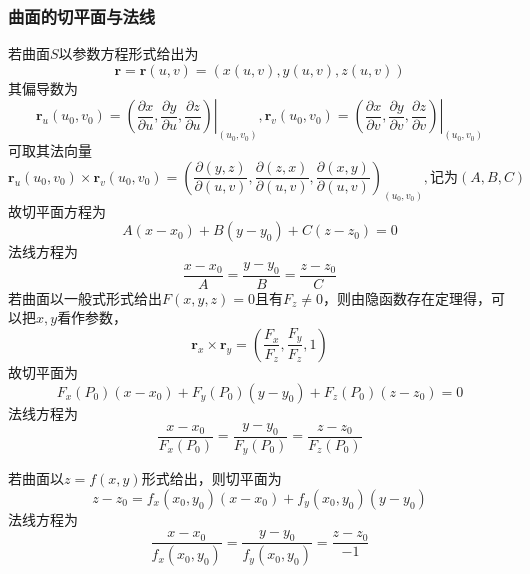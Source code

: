 \subsubsection{曲面的切平面与法线}
若曲面$ S $以参数方程形式给出为
\begin{equation}\label{key}
	\bm{r}=\bm{r}(u,v)=(x(u,v),y(u,v),z(u,v))
\end{equation}
其偏导数为
\begin{equation}\label{key}
	\bm{r}_u(u_0,v_0)=\left .(\dfrac{\partial x}{\partial u},\dfrac{\partial y}{\partial u},\dfrac{\partial z}{\partial u})\right |_{(u_0,v_0)},	\bm{r}_v(u_0,v_0)=\left .(\dfrac{\partial x}{\partial v},\dfrac{\partial y}{\partial v},\dfrac{\partial z}{\partial v})\right |_{(u_0,v_0)}
\end{equation}
可取其法向量
\begin{equation}\label{key}
	\bm{r}_u(u_0,v_0) \times \bm{r}_v(u_0,v_0)=(\dfrac{\partial (y,z)}{\partial (u,v)},\dfrac{\partial (z,x)}{\partial (u,v)},\dfrac{\partial (x,y)}{\partial (u,v)})_{(u_0,v_0)},\text{记为}(A,B,C)
\end{equation}
故切平面方程为
\begin{equation}\label{key}
	A(x-x_0)+B(y-y_0)+C(z-z_0)=0
\end{equation}
法线方程为
\begin{equation}\label{key}
	\dfrac{x-x_0}{A}=\dfrac{y-y_0}{B}=\dfrac{z-z_0}{C}
\end{equation}
若曲面以一般式形式给出$ F(x,y,z)=0 $且有$ F_z \neq 0 $，则由隐函数存在定理得，可以把$ x,y $看作参数，
\begin{equation}\label{key}
	\bm{r}_x\times \bm{r}_y=(\dfrac{F_x}{F_z},\dfrac{F_y}{F_z},1)
\end{equation}
故切平面为
\begin{equation}\label{key}
	F_x(P_0)(x-x_0)+F_y(P_0)(y-y_0)+F_z(P_0)(z-z_0)=0
\end{equation}
法线方程为
\begin{equation}\label{key}
	\dfrac{x-x_0}{F_x(P_0)}=\dfrac{y-y_0}{F_y(P_0)}=\dfrac{z-z_0}{F_z(P_0)}
\end{equation}

若曲面以$ z=f(x,y) $形式给出，则切平面为
\begin{equation}\label{key}
z-z_0=f_x(x_0,y_0)(x-x_0)+f_y(x_0,y_0)(y-y_0)
\end{equation}
法线方程为
\begin{equation}\label{key}
	\dfrac{x-x_0}{f_x(x_0,y_0)}=\dfrac{y-y_0}{f_y(x_0,y_0)}=\dfrac{z-z_0}{-1}
\end{equation}

